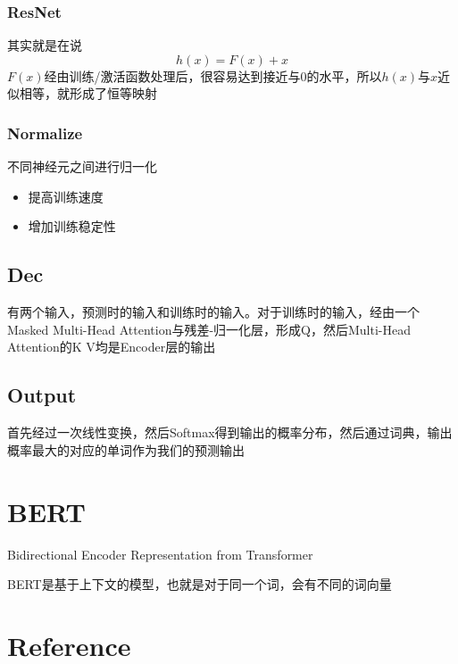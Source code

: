\documentclass{article}
\begin{document}
\begin{sloppypar}
      \subsubsection{ResNet}

      其实就是在说
      $$
            h(x)=F(x)+x
      $$
      $F(x)$经由训练/激活函数处理后，很容易达到接近与0的水平，所以$h(x)$与$x$近似相等，就形成了恒等映射

      \subsubsection{Normalize}

      不同神经元之间进行归一化
      \begin{itemize}
            \item 提高训练速度
            \item 增加训练稳定性
      \end{itemize}


      \subsection{Dec}
      有两个输入，预测时的输入和训练时的输入。对于训练时的输入，经由一个Masked Multi-Head Attention与残差-归一化层，形成Q，然后Multi-Head Attention的K V均是Encoder层的输出
      \subsection{Output}
      首先经过一次线性变换，然后Softmax得到输出的概率分布，然后通过词典，输出概率最大的对应的单词作为我们的预测输出

      \section{BERT}

      Bidirectional Encoder Representation from Transformer


      BERT是基于上下文的模型，也就是对于同一个词，会有不同的词向量

      \newpage
      \section{Reference}

      \nocite{*} %

      
      

\end{sloppypar}
\end{document}
